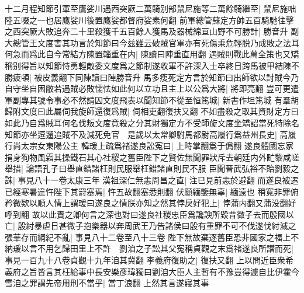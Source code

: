 十二月程知節引軍至鷹娑川遇西突厥二萬騎别部鼠尼施等二萬餘騎繼至|{
	鼠尼施咄陸五啜之一也居鷹娑川後置鷹娑都督府娑素何翻}
前軍總管蘇定方帥五百騎馳往擊之西突厥大敗追奔二十里殺獲千五百餘人獲馬及器械綿亘山野不可勝計|{
	勝音升}
副大總管王文度害其功言於知節曰今兹雖云破賊官軍亦有死傷乘危輕脱乃成敗之法耳何急而爲此自今常結方陳置輜重在内|{
	陳讀曰陣重直用翻}
遇賊則戰此萬全策也又矯稱别得旨以知節恃勇輕敵委文度爲之節制遂收軍不許深入士卒終日跨馬被甲結陳不勝疲頓|{
	被皮義翻下同陳讀曰陣勝音升}
馬多瘦死定方言於知節曰出師欲以討賊今乃自守坐自困敝若遇賊必敗懦怯如此何以立功且主上以公爲大將|{
	將即亮翻}
豈可更遣軍副專其號令事必不然請囚文度飛表以聞知節不從至恒篤城|{
	新書作坦篤城}
有羣胡歸附文度曰此屬伺我旋師還復爲賊|{
	伺相吏翻復扶又翻}
不如盡殺之取其資財定方曰如此乃自爲賊耳何名伐叛文度竟殺之分其財獨定方不受師旋文度坐矯詔當死特除名知節亦坐逗遛追賊不及減死免官　是歲以太常卿駙馬都尉高履行爲益州長史|{
	高履行尚太宗女東陽公主}
韓瑗上疏爲禇遂良訟寃曰|{
	上時掌翻爲于僞翻}
遂良體國忘家捐身狥物風霜其操鐵石其心社稷之舊臣陛下之賢佐無聞罪狀斥去朝廷内外甿黎咸嗟舉措|{
	論語孔子曰舉直錯諸枉則民服舉枉錯諸直則民不服}
臣聞晉武弘裕不貽劉毅之誅|{
	事見八十一卷太康三年}
漢祖深仁無恚周昌之直|{
	注已見前恚於避翻}
而遂良被遷已經寒暑違忤陛下其罸塞焉|{
	忤五故翻塞悉則翻}
伏願緬鑒無辜|{
	緬遠也}
稍寛非罪俯矜微欵以順人情上謂瑗曰遂良之情朕亦知之然其悖戾好犯上|{
	悖蒲内翻又蒲没翻好呼到翻}
故以此責之卿何言之深也對曰遂良社稷忠臣爲讒諛所毀昔微子去而殷國以亡|{
	殷紂暴虐日甚微子抱樂器以奔周武王乃告諸侯曰殷有重罪不可不伐遂伐紂滅之}
張華存而綱紀不亂|{
	事見八十二卷至八十三卷}
陛下無故棄逐舊臣恐非國家之福上不納瑗以言不用乞歸田里上不許　劉洎之子訟其父寃稱貞觀之末爲禇遂良所譛而死|{
	事見一百九十八卷貞觀十九年洎其冀翻}
李義府復助之|{
	復扶又翻}
上以問近臣衆希義府之旨皆言其枉給事中長安樂彥瑋獨曰劉洎大臣人主暫有不豫豈得遽自比伊霍今雪洎之罪謂先帝用刑不當乎|{
	當丁浪翻}
上然其言遂寢其事

